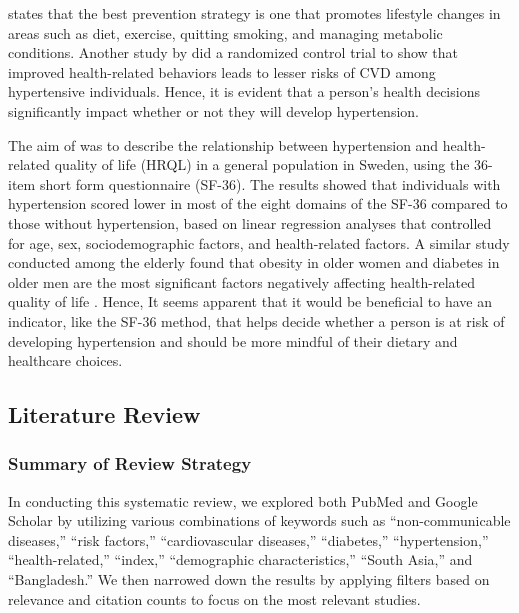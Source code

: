 \documentclass[
  12pt,
  a4paper]{article}
\begin{document}
\citet{budreviciute_management_2020} states that the best prevention strategy is one that promotes lifestyle changes in areas such as diet, exercise, quitting smoking, and managing metabolic conditions. Another study by \citet{burke_lifestyle_2007} did a randomized control trial to show that improved health-related behaviors leads to lesser risks of CVD among hypertensive individuals. Hence, it is evident that a person's health decisions significantly impact whether or not they will develop hypertension.

The aim of \citet{bardage_hypertension_2001} was to describe the relationship between hypertension and health-related quality of life (HRQL) in a general population in Sweden, using the 36-item short form questionnaire (SF-36). The results showed that individuals with hypertension scored lower in most of the eight domains of the SF-36 compared to those without hypertension, based on linear regression analyses that controlled for age, sex, sociodemographic factors, and health-related factors. A similar study conducted among the elderly found that obesity in older women and diabetes in older men are the most significant factors negatively affecting health-related quality of life \citep{banegas_relationship_2007}. Hence, It seems apparent that it would be beneficial to have an indicator, like the SF-36 method, that helps decide whether a person is at risk of developing hypertension and should be more mindful of their dietary and healthcare choices.

\subsection{Literature Review}\label{literature-review}

\subsubsection{Summary of Review Strategy}\label{summary-of-review-strategy}

In conducting this systematic review, we explored both PubMed and Google Scholar by utilizing various combinations of keywords such as ``non-communicable diseases,'' ``risk factors,'' ``cardiovascular diseases,'' ``diabetes,'' ``hypertension,'' ``health-related,'' ``index,'' ``demographic characteristics,'' ``South Asia,'' and ``Bangladesh.'' We then narrowed down the results by applying filters based on relevance and citation counts to focus on the most relevant studies.
\end{document}
